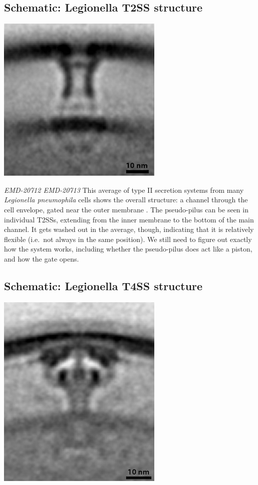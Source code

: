 \documentclass[]{tufte-book}
\begin{document}
\hypertarget{Legionella_T2SS_structure}{\subsection*{Schematic:
Legionella T2SS structure}\label{Legionella_T2SS_structure}}

\includegraphics{img/schematics/9_3_1}

\emph{EMD-20712 EMD-20713} This average of type II secretion systems
from many \emph{Legionella pneumophila} cells shows the overall
structure: a channel through the cell envelope, gated near the outer
membrane \citep{ghosal2019}. The pseudo-pilus can be seen in individual
T2SSs, extending from the inner membrane to the bottom of the main
channel. It gets washed out in the average, though, indicating that it
is relatively flexible (i.e.~not always in the same position). We still
need to figure out exactly how the system works, including whether the
pseudo-pilus does act like a piston, and how the gate opens.

\hypertarget{Legionella_T4SS_structure}{\subsection*{Schematic:
Legionella T4SS structure}\label{Legionella_T4SS_structure}}

\includegraphics{img/schematics/9_3_2}
\end{document}
